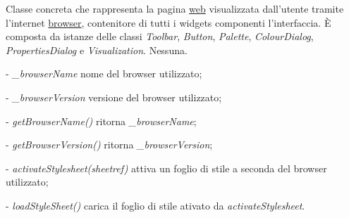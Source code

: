 Classe concreta che rappresenta la pagina \underline{web} visualizzata dall'utente tramite l'internet \underline{browser}, contenitore di tutti i widgets componenti l'interfaccia.
\` E composta da istanze delle classi \textit{Toolbar}, \textit{Button}, \textit{Palette}, \textit{ColourDialog}, \textit{PropertiesDialog} e \textit{Visualization}.
Nessuna.
\begin{elencopuntato}[\subsubsecindent]
\item[-] \textit{{\_}browserName} nome del browser utilizzato;
\item[-] \textit{{\_}browserVersion} versione del browser utilizzato;
\end{elencopuntato}
\begin{elencopuntato}[\subsubsecindent]
\item[-] \textit{getBrowserName()} ritorna \textit{{\_}browserName};
\item[-] \textit{getBrowserVersion()} ritorna \textit{{\_}browserVersion};
\item[-] \textit{activateStylesheet(sheetref)} attiva un foglio di stile a seconda del browser utilizzato;
\item[-] \textit{loadStyleSheet()} carica il foglio di stile ativato da \textit{activateStylesheet}.
\end{elencopuntato}

